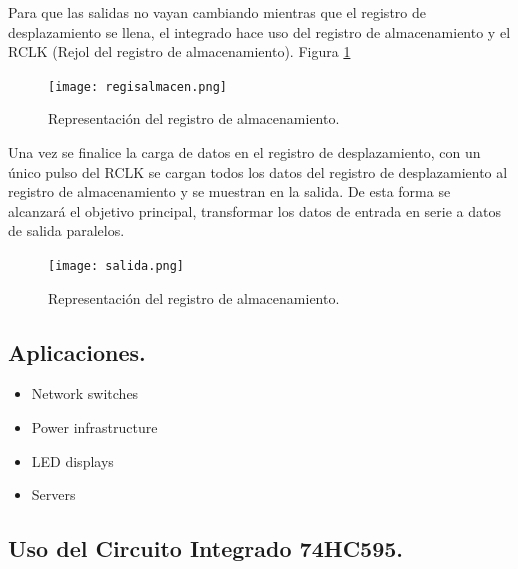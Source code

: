 \documentclass{article}
\begin{document}
Para que las salidas no vayan cambiando mientras que el registro de desplazamiento se llena, el integrado hace uso del registro de almacenamiento y el RCLK (Rejol del registro de almacenamiento). Figura \ref{fig:registroalmacenamiento}

\begin{figure}[h]
\texttt{[image: regisalmacen.png]}
\centering
\caption{Representación del registro de almacenamiento.}
\label{fig:registroalmacenamiento}
\end{figure}

Una vez se finalice la carga de datos en el registro de desplazamiento, con un único pulso del RCLK se cargan todos los datos del registro de desplazamiento al registro de almacenamiento y se muestran en la salida. De esta forma se alcanzará el objetivo principal, transformar los datos de entrada en serie a datos de salida paralelos.

\newpage
\begin{figure}[h]
\texttt{[image: salida.png]}
\centering
\caption{Representación del registro de almacenamiento.}
\label{fig:salida}
\end{figure}


\subsection{Aplicaciones.}\label{Aplicaciones}
\begin{itemize}
\item Network switches
\item Power infrastructure
\item LED displays
\item Servers
\end{itemize}

\newpage
\subsection{Uso del Circuito Integrado 74HC595.}\label{Usocircuito}
\end{document}
